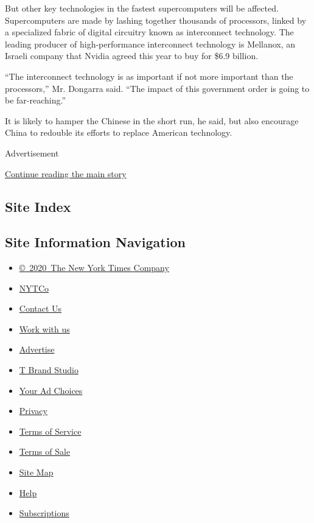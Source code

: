 But other key technologies in the fastest supercomputers will be
affected. Supercomputers are made by lashing together thousands of
processors, linked by a specialized fabric of digital circuitry known as
interconnect technology. The leading producer of high-performance
interconnect technology is Mellanox, an Israeli company that Nvidia
agreed this year to buy for \$6.9 billion.

``The interconnect technology is as important if not more important than
the processors,'' Mr. Dongarra said. ``The impact of this government
order is going to be far-reaching.''

It is likely to hamper the Chinese in the short run, he said, but also
encourage China to redouble its efforts to replace American technology.

Advertisement

\protect\hyperlink{after-bottom}{Continue reading the main story}

\hypertarget{site-index}{%
\subsection{Site Index}\label{site-index}}

\hypertarget{site-information-navigation}{%
\subsection{Site Information
Navigation}\label{site-information-navigation}}

\begin{itemize}
\tightlist
\item
  \href{https://help.nytimes.com/hc/en-us/articles/115014792127-Copyright-notice}{©~2020~The
  New York Times Company}
\end{itemize}

\begin{itemize}
\tightlist
\item
  \href{https://www.nytco.com/}{NYTCo}
\item
  \href{https://help.nytimes.com/hc/en-us/articles/115015385887-Contact-Us}{Contact
  Us}
\item
  \href{https://www.nytco.com/careers/}{Work with us}
\item
  \href{https://nytmediakit.com/}{Advertise}
\item
  \href{http://www.tbrandstudio.com/}{T Brand Studio}
\item
  \href{https://www.nytimes.com/privacy/cookie-policy\#how-do-i-manage-trackers}{Your
  Ad Choices}
\item
  \href{https://www.nytimes.com/privacy}{Privacy}
\item
  \href{https://help.nytimes.com/hc/en-us/articles/115014893428-Terms-of-service}{Terms
  of Service}
\item
  \href{https://help.nytimes.com/hc/en-us/articles/115014893968-Terms-of-sale}{Terms
  of Sale}
\item
  \href{https://spiderbites.nytimes.com}{Site Map}
\item
  \href{https://help.nytimes.com/hc/en-us}{Help}
\item
  \href{https://www.nytimes.com/subscription?campaignId=37WXW}{Subscriptions}
\end{itemize}
